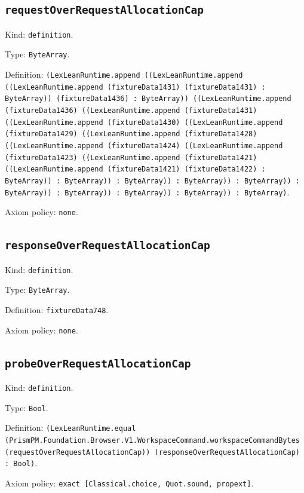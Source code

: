 \documentclass[11pt]{article}
\begin{document}
\subsection*{\texttt{requestOverRequestAllocationCap}}
\noindent Kind: \texttt{definition}.\par
\noindent Type: \texttt{ByteArray}.\par
\noindent Definition: \texttt{(LexLeanRuntime.append ((LexLeanRuntime.append ((LexLeanRuntime.append (fixtureData1431) (fixtureData1431) : ByteArray)) (fixtureData1436) : ByteArray)) ((LexLeanRuntime.append (fixtureData1436) ((LexLeanRuntime.append (fixtureData1431) ((LexLeanRuntime.append (fixtureData1430) ((LexLeanRuntime.append (fixtureData1429) ((LexLeanRuntime.append (fixtureData1428) ((LexLeanRuntime.append (fixtureData1424) ((LexLeanRuntime.append (fixtureData1423) ((LexLeanRuntime.append (fixtureData1421) ((LexLeanRuntime.append (fixtureData1421) (fixtureData1422) : ByteArray)) : ByteArray)) : ByteArray)) : ByteArray)) : ByteArray)) : ByteArray)) : ByteArray)) : ByteArray)) : ByteArray)) : ByteArray)}.\par
\noindent Axiom policy: \texttt{none}.\par
\subsection*{\texttt{responseOverRequestAllocationCap}}
\noindent Kind: \texttt{definition}.\par
\noindent Type: \texttt{ByteArray}.\par
\noindent Definition: \texttt{fixtureData748}.\par
\noindent Axiom policy: \texttt{none}.\par
\subsection*{\texttt{probeOverRequestAllocationCap}}
\noindent Kind: \texttt{definition}.\par
\noindent Type: \texttt{Bool}.\par
\noindent Definition: \texttt{(LexLeanRuntime.equal (PrismPM.Foundation.Browser.V1.WorkspaceCommand.workspaceCommandBytes (requestOverRequestAllocationCap)) (responseOverRequestAllocationCap) : Bool)}.\par
\noindent Axiom policy: \texttt{exact [Classical.choice, Quot.sound, propext]}.\par
\end{document}
